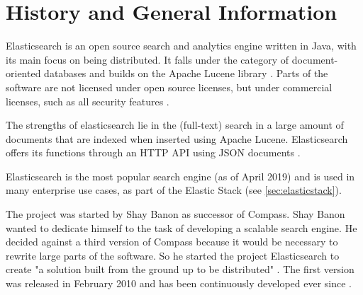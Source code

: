 \chapter{History and General Information}

Elasticsearch is an open source search and analytics engine written in Java, with its main focus on being distributed. It falls under the category of document-oriented databases and builds on the Apache Lucene library \autocite{andrewcholakian2019}. Parts of the software are not licensed under open source licenses, but under commercial licenses, such as all security features \autocite{elasticsearc_sec}.

The strengths of elasticsearch lie in the (full-text) search in a large amount of documents that are indexed when inserted using Apache Lucene. Elasticsearch offers its functions through an HTTP API using JSON documents \autocite{andrewcholakian2019}.

Elasticsearch is the most popular search engine (as of April 2019) \autocite{soliditgmbh2019} and is used in many enterprise use cases, as part of the Elastic Stack (see \ref{sec:elasticstack}).

The project was started by Shay Banon as successor of Compass. Shay Banon wanted to dedicate himself to the task of developing a scalable search engine. He decided against a third version of Compass because it would be necessary to rewrite large parts of the software. So he started the project Elasticsearch to create "a solution built from the ground up to be distributed" \autocite{shaybanon2019}. The first version was released in February 2010 and has been continuously developed ever since \autocite{elasticsearchb.v.2019}.

